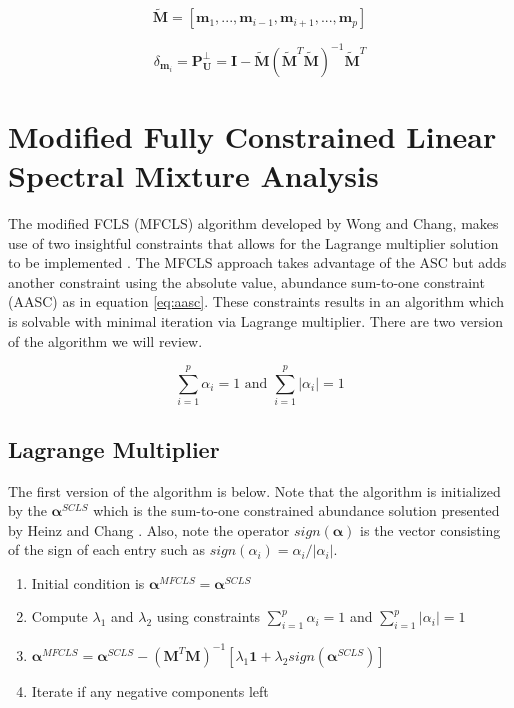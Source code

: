 \documentclass[journal]{IEEEtran}
\begin{document}
\begin{equation}
\label{eq:osp_m}
\mathbf{\tilde{M}} = \left[\mathbf{m}_1,...,\mathbf{m}_{i-1}, \mathbf{m}_{i+1}, ..., \mathbf{m}_p\right]
\end{equation}

\begin{equation}
\label{eq:osp_p}
\delta_{\mathbf{m}_i}=\mathbf{P}_{\mathbf{U}}^\perp = \mathbf{I} - \mathbf{\tilde{M}}\left(\mathbf{\tilde{M}}^T\mathbf{\tilde{M}}\right)^{-1}\mathbf{\tilde{M}}^T
\end{equation}

\section{Modified Fully Constrained Linear Spectral Mixture Analysis}
The modified FCLS (MFCLS) algorithm developed by Wong and Chang, makes use of two insightful constraints that allows for the Lagrange multiplier solution to be implemented \cite{wong}. The MFCLS approach takes advantage of the ASC but adds another constraint using the absolute value, abundance sum-to-one constraint (AASC) as in equation \ref{eq:aasc}. These constraints results in an algorithm which is solvable with minimal iteration via Lagrange multiplier. There are two version of the algorithm we will review.

\begin{equation}
\label{eq:aasc}
\sum_{i=1}^{p}\alpha_i = 1 \text{          and         } \sum_{i=1}^{p}|\alpha_i| = 1
\end{equation}

\subsection{Lagrange Multiplier}
The first version of the algorithm is below. Note that the algorithm is initialized by the \(\mathbf{\alpha}^{SCLS}\) which is the sum-to-one constrained abundance solution presented by Heinz and Chang \cite{heinz}. Also, note the operator \(sign(\mathbf{\alpha})\) is the vector consisting of the sign of each entry such as \(sign(\alpha_i) = \alpha_i/|\alpha_i|\).

\begin{enumerate}
\item Initial condition is \(\mathbf{\alpha}^{MFCLS}=\mathbf{\alpha}^{SCLS}\)
\item Compute \(\lambda_1\) and \(\lambda_2\) using constraints \(\sum_{i=1}^{p}\alpha_i = 1\) and \(\sum_{i=1}^{p}|\alpha_i| = 1\)
\item \({\mathbf{\alpha}^{MFCLS}=\mathbf{\alpha}^{SCLS}-\left(\mathbf{M}^T\mathbf{M}\right)^{-1}\left[\lambda_1\mathbf{1}+\lambda_2 sign(\mathbf{\alpha}^{SCLS})\right]}\)
\item Iterate if any negative components left
\end{enumerate}
\end{document}
